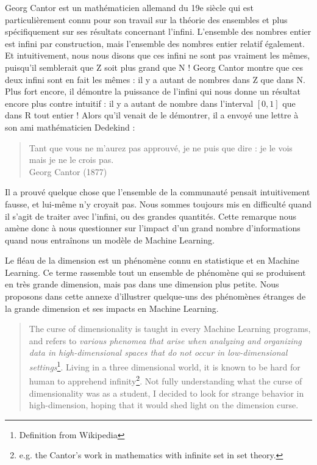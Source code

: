 Georg Cantor est un mathématicien allemand du 19e siècle qui est particulièrement connu pour son travail sur la théorie des ensembles et plus spécifiquement sur ses résultats concernant l’infini. L’ensemble des nombres entier est infini par construction, mais l’ensemble des nombres entier relatif également. Et intuitivement, nous nous disons que ces infini ne sont pas vraiment les mêmes, puisqu’il semblerait que Z soit plus grand que N ! Georg Cantor montre que ces deux infini sont en fait les mêmes : il y a autant de nombres dans Z que dans N. Plus fort encore, il démontre la puissance de l’infini qui nous donne un résultat encore plus contre intuitif : il y a autant de nombre dans l’interval $[0, 1]$ que dans R tout entier ! Alors qu’il venait de le démontrer, il a envoyé une lettre à son ami mathématicien Dedekind :

\begin{quotation}
    Tant que vous ne m’aurez pas approuvé, je ne puis que dire : je le vois mais je ne le crois pas.
    \\
    Georg Cantor (1877)
\end{quotation}
Il a prouvé quelque chose que l’ensemble de la communauté pensait intuitivement fausse, et lui-même n’y croyait pas. Nous sommes toujours mis en difficulté quand il s’agit de traiter avec l’infini, ou des grandes quantités. Cette remarque nous amène donc à nous questionner sur l’impact d’un grand nombre d’informations quand nous entraînons un modèle de Machine Learning.


Le fléau de la dimension est un phénomène connu en statistique et en Machine Learning. Ce terme rassemble tout un ensemble de phénomène qui se produisent en très grande dimension, mais pas dans une dimension plus petite. Nous proposons dans cette annexe d’illustrer quelque-uns des phénomènes étranges de la grande dimension et ses impacts en Machine Learning.
\begin{quotation}
    The curse of dimensionality is taught in every Machine Learning programs, and refers to \textit{various phenomea that arise when analyzing and organizing data in high-dimensional spaces that do not occur in low-dimensional settings}\footnote{Definition from Wikipedia}. Living in a three dimensional world, it is known to be hard for human to apprehend infinity\footnote{e.g. the Cantor's work in mathematics with infinite set in set theory.}. Not fully understanding what the curse of dimensionality was as a student, I decided to look for strange behavior in high-dimension, hoping that it would shed light on the dimension curse.
\end{quotation}

